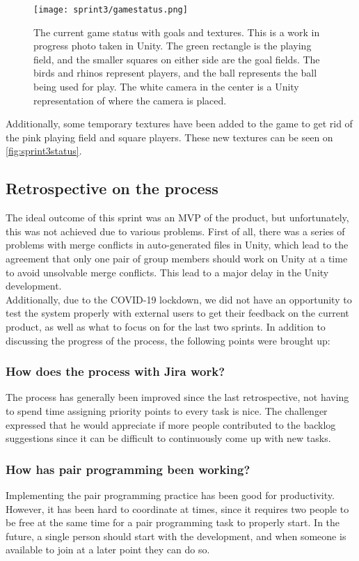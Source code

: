 \begin{figure}[H]
	\centering
	\texttt{[image: sprint3/gamestatus.png]}
	\caption{The current game status with goals and textures. This is a work in progress photo taken in Unity. The green rectangle is the playing field, and the smaller squares on either side are the goal fields. The birds and rhinos represent players, and the ball represents the ball being used for play. The white camera in the center is a Unity representation of where the camera is placed.}
	\label{fig:sprint3status}
\end{figure}
\noindent
Additionally, some temporary textures have been added to the game to get rid of the pink playing field and square players.
These new textures can be seen on \autoref{fig:sprint3status}.

\subsection{Retrospective on the process}
The ideal outcome of this sprint was an MVP of the product, but unfortunately, this was not achieved due to various problems.
First of all, there was a series of problems with merge conflicts in auto-generated files in Unity, which lead to the agreement that only one pair of group members should work on Unity at a time to avoid unsolvable merge conflicts.
This lead to a major delay in the Unity development.\\
Additionally, due to the COVID-19 lockdown, we did not have an opportunity to test the system properly with external users to get their feedback on the current product, as well as what to focus on for the last two sprints.
In addition to discussing the progress of the process, the following points were brought up:

\subsubsection*{How does the process with Jira work?}
The process has generally been improved since the last retrospective, not having to spend time assigning priority points to every task is nice.
The challenger expressed that he would appreciate if more people contributed to the backlog suggestions since it can be difficult to continuously come up with new tasks.


\subsubsection*{How has pair programming been working?}
Implementing the pair programming practice has been good for productivity.
However, it has been hard to coordinate at times, since it requires two people to be free at the same time for a pair programming task to properly start.
In the future, a single person should start with the development, and when someone is available to join at a later point they can do so.

